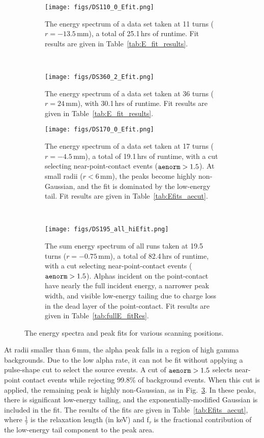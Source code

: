 \documentclass[groupedaddress,rmp,amsmath,amssymb,bibnotes,altaffilletter,twocolumn]{revtex4-1}
\begin{document}
\begin{figure*}[]
 \centering
  \begin{subfigure}[]{.45\textwidth}
 \texttt{[image: figs/DS110\_0\_Efit.png]}
  \caption{The energy spectrum of a data set taken at 11 turns ($r= -13.5$\,mm), a total of 25.1\,hrs of runtime. Fit results are given in Table~\ref{tab:E_fit_results}.}
 \label{fig:Efit_110}
\end{subfigure}
~
  \begin{subfigure}[]{.45\textwidth}
 \texttt{[image: figs/DS360\_2\_Efit.png]}
  \caption{The energy spectrum of a data set taken at 36 turns ($r = 24$\,mm), with 30.1\,hrs of runtime. Fit results are given in Table~\ref{tab:E_fit_results}.}
 \label{fig:Efit_360}
\end{subfigure}

 \begin{subfigure}[]{.45\textwidth}
 \texttt{[image: figs/DS170\_0\_Efit.png]}
  \caption{The energy spectrum of a data set taken at 17 turns ($r = -4.5$\,mm), a total of 19.1\,hrs of runtime, with a cut selecting near-point-contact events (${\tt aenorm} > 1.5$). At small radii ($r<6$\,mm), the peaks become highly non-Gaussian, and the fit is dominated by the low-energy tail. Fit results are given in Table~\ref{tab:Efits_aecut}.}
 \label{fig:Efit_170}
\end{subfigure}
~
 \begin{subfigure}[]{.45\textwidth}
 \texttt{[image: figs/DS195\_all\_hiEfit.png]}
 \caption{The sum energy spectrum of all runs taken at 19.5 turns ($r = -0.75$\,mm), a total of 82.4\,hrs of runtime, with a cut selecting near-point-contact events (${\tt aenorm} > 1.5$). Alphas incident on the point-contact have nearly the full incident energy, a narrower peak width, and visible low-energy tailing due to charge loss in the dead layer of the point-contact. Fit results are given in Table~\ref{tab:fullE_fitRes}.}
 \label{fig:Efit_195}
\end{subfigure}
 \caption{The energy spectra and peak fits for various scanning positions.} 
 \label{fig:Epeaks}
\end{figure*}

At radii smaller than 6\,mm, the alpha peak falls in a region of high gamma backgrounds. Due to the low alpha rate, it can not be fit without applying a pulse-shape cut to select the source events. A cut of ${\tt aenorm} >1.5$ selects near-point contact events while rejecting 99.8\% of background events. When this cut is applied, the remaining peak is highly non-Gaussian, as in Fig.~\ref{fig:Efit_170}. In these peaks, there is significant low-energy tailing, and the exponentially-modified Gaussian is included in the fit. The results of the fits are given in Table~\ref{tab:Efits_aecut}, where $\frac{1}{\tau}$ is the relaxation length (in keV) and  f$_{\tau}$ is the fractional contribution of the low-energy tail component to the peak area.
\end{document}
